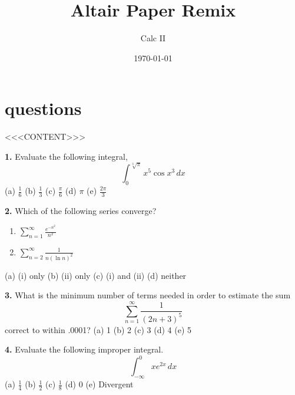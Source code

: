 \documentclass[a4paper,12pt]{article}
\title{Altair Paper Remix}
\author{Calc II}
\date{\today}
\begin{document}
\maketitle

\section{questions}

<<<CONTENT>>>

\noindent
\textbf{1.} Evaluate the following integral,
$$
\int_0^{\sqrt[3]{\pi}} x^5 \cos{x^3} \, dx
$$
(a) $\frac{1}{6}$ (b) $\frac{1}{3}$ (c) $\frac{\pi}{6}$ (d) $\pi$ (e) $\frac{2\pi}{3}$

\medskip
\noindent
\textbf{2.} Which of the following series converge?
\begin{enumerate}
    \item[(i)] $\sum_{n=1}^\infty \frac{e^{-n^2}}{n^2}$
    \item[(ii)] $\sum_{n=2}^\infty \frac{1}{n (\ln{n})^2}$
\end{enumerate}
(a) (i) only (b) (ii) only (c) (i) and (ii) (d) neither

\medskip
\noindent
\textbf{3.} What is the minimum number of terms needed in order to estimate the sum
$$
\sum_{n=1}^\infty \frac{1}{(2n+3)^5}
$$
correct to within .0001?
(a) 1 (b) 2 (c) 3 (d) 4 (e) 5

\medskip
\noindent
\textbf{4.} Evaluate the following improper integral.
$$
\int_{-\infty}^0 x e^{2x} \, dx
$$
(a) $\frac{1}{4}$ (b) $\frac{1}{2}$ (c) $\frac{1}{8}$ (d) 0 (e) Divergent
\end{document}
